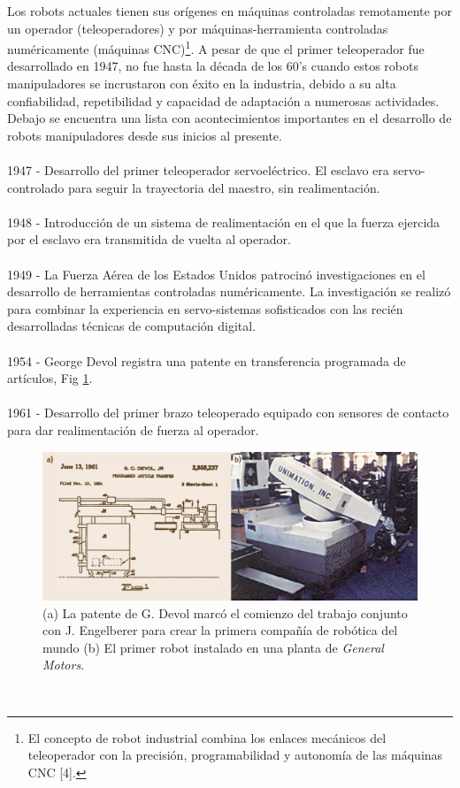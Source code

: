 Los robots actuales tienen sus orígenes en máquinas controladas remotamente por un operador (teleoperadores) y por máquinas-herramienta controladas numéricamente (máquinas CNC)\footnote{El concepto de robot industrial combina los enlaces mecánicos del teleoperador con la precisión, programabilidad y autonomía de las máquinas CNC [4].}. A pesar de que el primer teleoperador fue desarrollado en 1947, no fue hasta la década de los 60's cuando estos robots manipuladores se incrustaron con éxito en la industria, debido a su alta confiabilidad, repetibilidad y capacidad de adaptación a numerosas actividades. Debajo se encuentra una lista con acontecimientos importantes en el desarrollo de robots manipuladores desde sus inicios al presente.\\\\
1947 - Desarrollo del primer teleoperador servoeléctrico. El esclavo era servo-controlado para seguir la trayectoria del maestro, sin realimentación.\\\\
1948 - Introducción de un sistema de realimentación en el que la fuerza ejercida por el esclavo era transmitida de vuelta al operador.\\\\
1949 - La Fuerza Aérea de los Estados Unidos patrocinó investigaciones en el desarrollo de herramientas controladas numéricamente. La investigación se realizó para combinar la experiencia en servo-sistemas sofisticados con las recién desarrolladas técnicas de computación digital.\\\\
1954 - George Devol registra una patente en transferencia programada de artículos, Fig \ref{unimation}.\\\\
1961 - Desarrollo del primer brazo teleoperado equipado con sensores de contacto para dar realimentación de fuerza al operador.\\
\begin{figure}
	\centering
	\includegraphics[scale=0.4]{Capitulo1/figs/Unimation.PNG} 
	\caption{(a) La patente de G. Devol marcó el comienzo del trabajo conjunto con J. Engelberer para crear la primera compañía de robótica del mundo (b) El primer robot instalado en una planta de \textit{General Motors}.}
	\label{unimation}
\end{figure}\\
